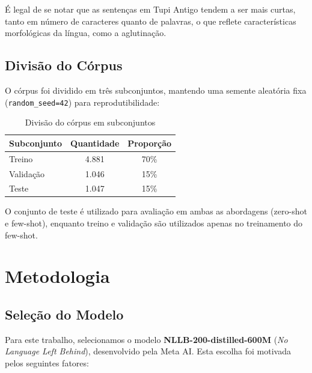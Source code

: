 \documentclass[12pt,a4paper]{article}
\begin{document}
É legal de se notar que as sentenças em Tupi Antigo tendem a ser mais curtas, tanto em número de caracteres quanto de palavras, o que reflete características morfológicas da língua, como a aglutinação.

\subsection{Divisão do Córpus}

O córpus foi dividido em três subconjuntos, mantendo uma semente aleatória fixa (\texttt{random\_seed=42}) para reprodutibilidade:

\begin{table}[H]
\centering
\caption{Divisão do córpus em subconjuntos}
\begin{tabular}{lcc}
\toprule
\textbf{Subconjunto} & \textbf{Quantidade} & \textbf{Proporção} \\
\midrule
Treino & 4.881 & 70\% \\
Validação & 1.046 & 15\% \\
Teste & 1.047 & 15\% \\
\bottomrule
\end{tabular}
\label{tab:split}
\end{table}

O conjunto de teste é utilizado para avaliação em ambas as abordagens (zero-shot e few-shot), enquanto treino e validação são utilizados apenas no treinamento do few-shot.

\section{Metodologia}

\subsection{Seleção do Modelo}

Para este trabalho, selecionamos o modelo \textbf{NLLB-200-distilled-600M} (\textit{No Language Left Behind}), desenvolvido pela Meta AI. Esta escolha foi motivada pelos seguintes fatores:
\end{document}
